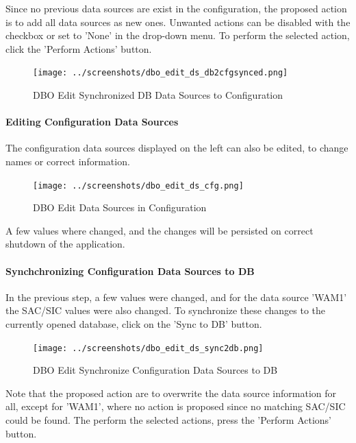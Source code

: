 {Since no previous data sources are exist in the configuration, the proposed action is to add all data sources as new ones. Unwanted actions can be disabled with the checkbox or set to 'None' in the drop-down menu. To perform the selected action, click the 'Perform Actions' button.

\begin{figure}[H]
  \hspace*{-2cm}
    \texttt{[image: ../screenshots/dbo\_edit\_ds\_db2cfgsynced.png]}
  \caption{DBO Edit Synchronized DB Data Sources to Configuration }
  \label{fig:dbo_edit_ds_db2cfgsynced}
\end{figure}

\paragraph{Editing Configuration Data Sources}

The configuration data sources displayed on the left can also be edited, to change names or correct information.

\begin{figure}[H]
  \hspace*{-2cm}
    \texttt{[image: ../screenshots/dbo\_edit\_ds\_cfg.png]}
  \caption{DBO Edit Data Sources in Configuration}
  \label{fig:dbo_edit_ds_cfg}
\end{figure}

A few values where changed, and the changes will be persisted on correct shutdown of the application.

\paragraph{Synchchronizing Configuration Data Sources to DB}

In the previous step, a few values were changed, and for the data source 'WAM1' the SAC/SIC values were also changed. To synchronize these changes to the currently opened database, click on the 'Sync to DB' button.

\begin{figure}[H]
  \hspace*{-2cm}
    \texttt{[image: ../screenshots/dbo\_edit\_ds\_sync2db.png]}
  \caption{DBO Edit Synchronize Configuration Data Sources to DB}
  \label{fig:dbo_edit_ds_sync2db}
\end{figure}

Note that the proposed action are to overwrite the data source information for all, except for 'WAM1', where no action is proposed since no matching SAC/SIC could be found. The perform the selected actions, press the 'Perform Actions' button.

}
